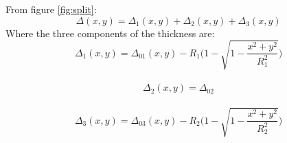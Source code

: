 From figure \ref{fig:split}:
\begin{equation}
\label{eq:split}
	\Delta(x,y)=\Delta_1(x,y)+\Delta_2(x,y)+\Delta_3(x,y)
\end{equation}
Where the three components of the thickness are:
\begin{equation}
\label{eq:delta1}
\Delta_1(x,y)=\Delta_{01}(x,y)-R_1\bigg(1-\sqrt{1-\frac{x^2+y^2}{R_1^2}}\bigg)
\end{equation}
\\
\begin{equation}
\label{eq:delta2}
\Delta_2(x,y)=\Delta_{02}
\end{equation}
\\
\begin{equation}
\label{eq:delta3}
\Delta_3(x,y)=\Delta_{03}(x,y)-R_2\bigg(1-\sqrt{1-\frac{x^2+y^2}{R_2^2}}\bigg)
\end{equation}
\\


